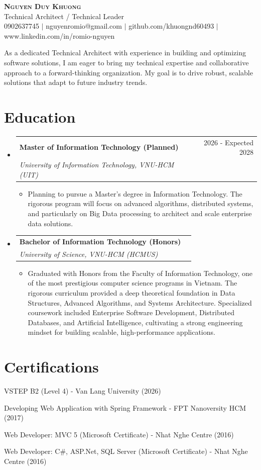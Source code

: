 \documentclass[letterpaper,11pt]{article}
\makeatletter
\newcommand{\resumeItem}[1]{
  \item\small{
    {#1 \vspace{-2pt}}
  }
}
\newcommand{\resumeSubheading}[4]{
  \vspace{-2pt}\item
    \begin{tabular*}{0.97\textwidth}[t]{l@{\extracolsep{\fill}}r}
      \textbf{#1} & #2 \\
      \textit{\small#3} & \textit{\small #4} \\
    \end{tabular*}\vspace{-7pt}
}
\newcommand{\resumeSubHeadingListStart}{\begin{itemize}[leftmargin=0.15in, label={}]}
\newcommand{\resumeSubHeadingListEnd}{\end{itemize}}
\newcommand{\resumeItemListStart}{\begin{itemize}}
\newcommand{\resumeItemListEnd}{\end{itemize}\vspace{-5pt}}
\makeatother
\begin{document}
\begin{center}
    \textbf{\Huge \scshape Nguyen Duy Khuong} \\ \vspace{1pt}
    \small Technical Architect / Technical Leader \\ \vspace{2pt}
    \small 0902637745 $|$ nguyenromio@gmail.com $|$ github.com/khuongnd60493 $|$ www.linkedin.com/in/romio-nguyen
\end{center}

\vspace{4pt}
\small As a dedicated Technical Architect with experience in building and optimizing software solutions, I am eager to bring my technical expertise and collaborative approach to a forward-thinking organization. My goal is to drive robust, scalable solutions that adapt to future industry trends.

\section{Education}
  \resumeSubHeadingListStart
    \resumeSubheading
      {Master of Information Technology (Planned)}{2026 - Expected 2028}
      {University of Information Technology, VNU-HCM (UIT)}{}
      \resumeItemListStart
        \resumeItem{Planning to pursue a Master's degree in Information Technology. The rigorous program will focus on advanced algorithms, distributed systems, and particularly on Big Data processing to architect and scale enterprise data solutions.}
      \resumeItemListEnd

    \resumeSubheading
      {Bachelor of Information Technology (Honors)}{}
      {University of Science, VNU-HCM (HCMUS)}{}
      \resumeItemListStart
        \resumeItem{Graduated with Honors from the Faculty of Information Technology, one of the most prestigious computer science programs in Vietnam. The rigorous curriculum provided a deep theoretical foundation in Data Structures, Advanced Algorithms, and Systems Architecture. Specialized coursework included Enterprise Software Development, Distributed Databases, and Artificial Intelligence, cultivating a strong engineering mindset for building scalable, high-performance applications.}
      \resumeItemListEnd
  \resumeSubHeadingListEnd

\section{Certifications}
\begin{itemize}[leftmargin=0.15in, label={}]
  \small{\item{
        \resumeItem{VSTEP B2 (Level 4) - Van Lang University (2026)}
        \resumeItem{Developing Web Application with Spring Framework - FPT Nanoversity HCM (2017)}
        \resumeItem{Web Developer: MVC 5 (Microsoft Certificate) - Nhat Nghe Centre (2016)}
        \resumeItem{Web Developer: C\#, ASP.Net, SQL Server (Microsoft Certificate) - Nhat Nghe Centre (2016)}
  }}
\end{itemize}
\end{document}

